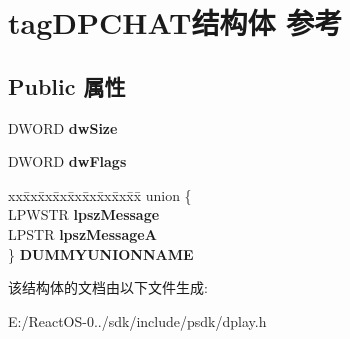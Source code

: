 \hypertarget{structtag_d_p_c_h_a_t}{}\section{tag\+D\+P\+C\+H\+A\+T结构体 参考}
\label{structtag_d_p_c_h_a_t}
\subsection*{Public 属性}
\begin{DoxyCompactItemize}
\item 
\mbox{\label{structtag_d_p_c_h_a_t_a4f2b2f260019e8c3d39001f82ebc190b}} 
D\+W\+O\+RD {\bfseries dw\+Size}
\item 
\mbox{\label{structtag_d_p_c_h_a_t_a587ebe0764a2b2be12cc31e6abfdc12c}} 
D\+W\+O\+RD {\bfseries dw\+Flags}
\item 
\mbox{\label{structtag_d_p_c_h_a_t_a2bd01323c76f309a9278d2dfcf80bab1}} 
\begin{tabbing}
xx\=xx\=xx\=xx\=xx\=xx\=xx\=xx\=xx\=\kill
union \{\\
\>LPWSTR {\bfseries lpszMessage}\\
\>LPSTR {\bfseries lpszMessageA}\\
\} {\bfseries DUMMYUNIONNAME}\\

\end{tabbing}\end{DoxyCompactItemize}


该结构体的文档由以下文件生成\+:\begin{DoxyCompactItemize}
\item 
E\+:/\+React\+O\+S-\/0../sdk/include/psdk/dplay.\+h\end{DoxyCompactItemize}

